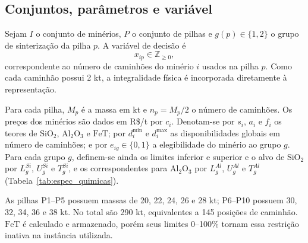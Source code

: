 \documentclass[10pt,twocolumn,a4paper]{article}
\begin{document}
\subsection{Conjuntos, parâmetros e variável}

Sejam $I$ o conjunto de minérios, $P$ o conjunto de pilhas e $g(p) \in \{1, 2\}$ o grupo de sinterização da pilha $p$. A variável de decisão é
\begin{equation}
x_{ip} \in \mathbb{Z}_{\ge 0},
\end{equation}
correspondente ao número de caminhões do minério $i$ usados na pilha $p$. Como cada caminhão possui 2 kt, a integralidade física é incorporada diretamente à representação.

Para cada pilha, $M_p$ é a massa em kt e $n_p = M_p/2$ o número de caminhões. Os preços dos minérios são dados em R\$/t por $c_i$. Denotam-se por $s_i$, $a_i$ e $f_i$ os teores de $\text{SiO}_2$, $\text{Al}_2\text{O}_3$ e $\text{FeT}$; por $d_i^{\min}$ e $d_i^{\max}$ as disponibilidades globais em número de caminhões; e por $e_{ig} \in \{0, 1\}$ a elegibilidade do minério ao grupo $g$. Para cada grupo $g$, definem-se ainda os limites inferior e superior e o alvo de $\text{SiO}_2$ por $L_g^{Si}$, $U_g^{Si}$ e $T_g^{Si}$, e os correspondentes para $\text{Al}_2\text{O}_3$ por $L_g^{Al}$, $U_g^{Al}$ e $T_g^{Al}$ (Tabela~\ref{tab:espec_quimicas}).

\begin{table}[H]
\centering
\caption{Especificações químicas por grupo.}
\label{tab:espec_quimicas}
\end{table}

As pilhas P1--P5 possuem massas de 20, 22, 24, 26 e 28 kt; P6--P10 possuem 30, 32, 34, 36 e 38 kt. No total são 290 kt, equivalentes a 145 posições de caminhão. $\text{FeT}$ é calculado e armazenado, porém seus limites 0--100\% tornam essa restrição inativa na instância utilizada.
\end{document}

